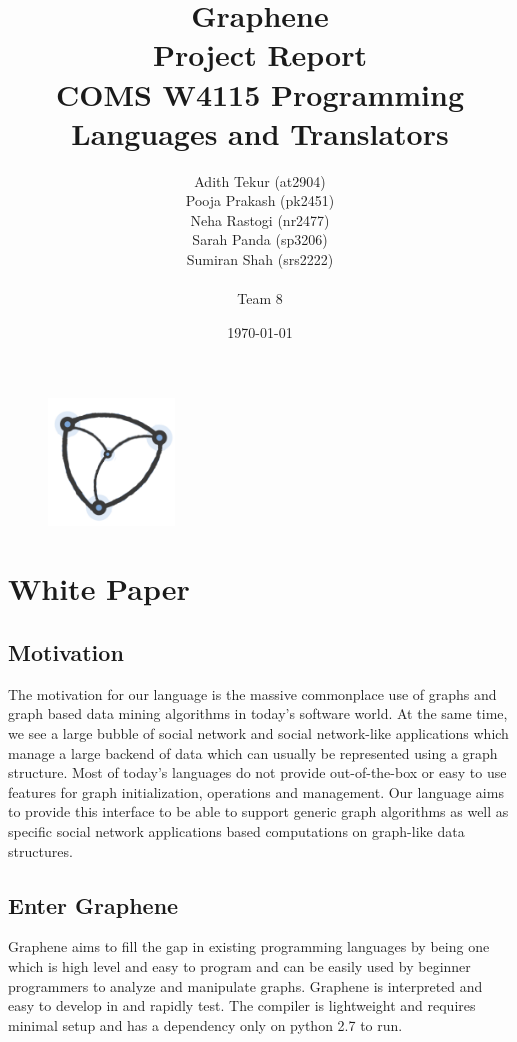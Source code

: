 \documentclass[a4paper]{article}
\title{\huge{Graphene}	\\	\LARGE{Project Report} \\ \large{COMS W4115 Programming Languages and Translators}}
\author{Adith Tekur (at2904) \\ Pooja Prakash (pk2451) \\ Neha Rastogi (nr2477) \\ Sarah Panda (sp3206) \\ Sumiran Shah (srs2222) \\ \\
Team 8}
\date{\today}
\begin{document}
\begin{figure}
\centering
\includegraphics[width=0.3\textwidth]{logo.png}
\end{figure}

\newpage
\maketitle
\newpage
\tableofcontents
\maketitle
\pagebreak
\clearpage

\setcounter{page}{1}

\section{White Paper}

\subsection{Motivation}
The motivation for our language is the massive commonplace use of graphs and graph based data mining algorithms in today's software world. At the same time, we see a large bubble of social network and social network-like applications which manage a large backend of data which can usually be represented using a graph structure. Most of today's languages do not provide out-of-the-box or easy to use features for graph initialization, operations and management. Our language aims to provide this interface to be able to support generic graph algorithms as well as specific social network applications based computations on graph-like data structures.
\newline

\subsection{Enter Graphene}
Graphene aims to fill the gap in existing programming languages by being one which is high level and easy to program and can be easily used by beginner programmers to analyze and manipulate graphs. Graphene is interpreted and easy to develop in and rapidly test. The compiler is lightweight and requires minimal setup and has a dependency only on python 2.7 to run.
\newline
\end{document}
